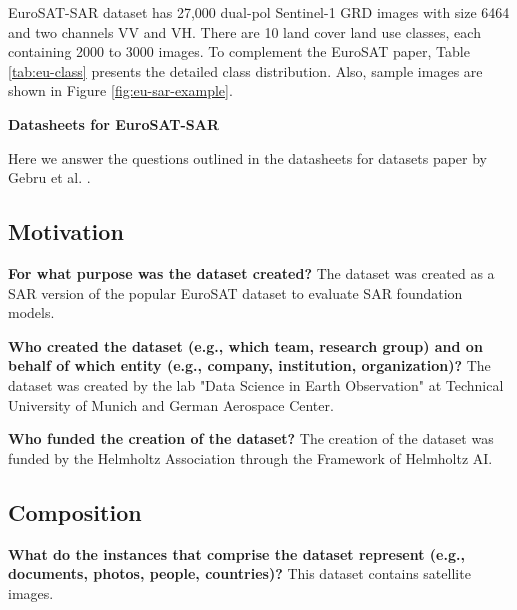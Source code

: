 \documentclass[lettersize,journal]{IEEEtran}
\begin{document}
EuroSAT-SAR dataset has 27,000 dual-pol Sentinel-1 GRD images with size 6464 and two channels VV and VH. There are 10 land cover land use classes, each containing 2000 to 3000 images. To complement the EuroSAT paper, Table \ref{tab:eu-class} presents the detailed class distribution. Also, sample images are shown in Figure \ref{fig:eu-sar-example}.











\clearpage
\newpage

\begin{figure*}
    \centering
\begin{minipage}{\textwidth}
\centering
\large\textbf{Datasheets for EuroSAT-SAR}
\end{minipage}
\end{figure*}

\setcounter{subsection}{0}
Here we answer the questions outlined in the datasheets for datasets paper by Gebru et al. \cite{gebru2021datasheets}.

\vspace{-3em}
\subsection{Motivation}
\vspace{-0.5em}

\textbf{For what purpose was the dataset created?} The dataset was created as a SAR version of the popular EuroSAT dataset to evaluate SAR foundation models.

\textbf{Who created the dataset (e.g., which team, research group) and on behalf of which entity (e.g.,
company, institution, organization)?} The dataset was created by the lab "Data Science in Earth Observation" at Technical University of Munich and German Aerospace Center.

\textbf{Who funded the creation of the dataset?} The creation of the dataset was funded by the Helmholtz Association through the Framework of Helmholtz AI.

\vspace{-2.5em}
\subsection{Composition}
\vspace{-0.5em}

\textbf{What do the instances that comprise the dataset represent (e.g., documents, photos, people, countries)?} This dataset contains satellite images.
\end{document}
